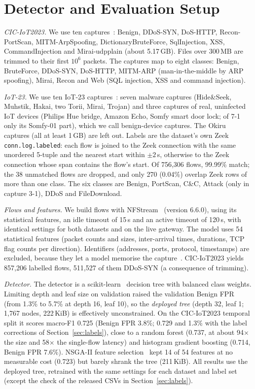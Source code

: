 \section{Detector and Evaluation Setup}\label{sec:setup}

\emph{CIC-IoT2023.} We use ten captures~\cite{neto2023ciciot2023}: Benign, DDoS-SYN, DoS-HTTP, Recon-PortScan, MITM-ArpSpoofing, DictionaryBruteForce, SqlInjection, XSS, CommandInjection and Mirai-udpplain (about 5.17\,GB). Files over 300\,MB are trimmed to their first $10^6$ packets. The captures map to eight classes: Benign, BruteForce, DDoS-SYN, DoS-HTTP, MITM-ARP (man-in-the-middle by ARP spoofing), Mirai, Recon and Web (SQL injection, XSS and command injection).

\emph{IoT-23.} We use ten IoT-23 captures~\cite{garcia2020iot23}: seven malware captures (Hide\&Seek, Muhstik, Hakai, two Torii, Mirai, Trojan) and three captures of real, uninfected IoT devices (Philips Hue bridge, Amazon Echo, Somfy smart door lock; of 7-1 only its Somfy-01 part), which we call benign-device captures. The Okiru captures (all at least 1\,GB) are left out. Labels are the dataset's own Zeek \texttt{conn.log.labeled}: each flow is joined to the Zeek connection with the same unordered 5-tuple and the nearest start within $\pm2$\,s, otherwise to the Zeek connection whose span contains the flow's start. Of 756,306 flows, 99.99\% match; the 38 unmatched flows are dropped, and only 270 (0.04\%) overlap Zeek rows of more than one class. The six classes are Benign, PortScan, C\&C, Attack (only in capture 3-1), DDoS and FileDownload.

\emph{Flows and features.} We build flows with NFStream~\cite{aouini2022nfstream} (version 6.6.0), using its statistical features, an idle timeout of 15\,s and an active timeout of 120\,s, with identical settings for both datasets and on the live gateway. The model uses 54 statistical features (packet counts and sizes, inter-arrival times, durations, TCP flag counts per direction). Identifiers (addresses, ports, protocol, timestamps) are excluded, because they let a model memorise the capture~\cite{arp2022dos}. CIC-IoT2023 yields 857,206 labelled flows, 511,527 of them DDoS-SYN (a consequence of trimming).

\emph{Detector.} The detector is a scikit-learn~\cite{pedregosa2011sklearn} decision tree with balanced class weights. Limiting depth and leaf size on validation raised the validation Benign FPR (from 1.3\% to 5.7\% at depth 16, leaf 10), so the \emph{deployed tree} (depth 32, leaf 1; 1,767 nodes, 222\,KiB) is effectively unconstrained. On the CIC-IoT2023 temporal split it scores macro-F1 0.725 (Benign FPR 3.8\%; 0.729 and 1.3\% with the label corrections of Section~\ref{sec:labels}), close to a random forest (0.737, at about 94$\times$ the size and 58$\times$ the single-flow latency) and histogram gradient boosting (0.714, Benign FPR 7.6\%). NSGA-II feature selection~\cite{deb2002nsga2,blank2020pymoo} kept 14 of 54 features at no measurable cost (0.723) but barely shrank the tree (211\,KiB). All results use the deployed tree, retrained with the same settings for each dataset and label set (except the check of the released CSVs in Section~\ref{sec:labels}).

